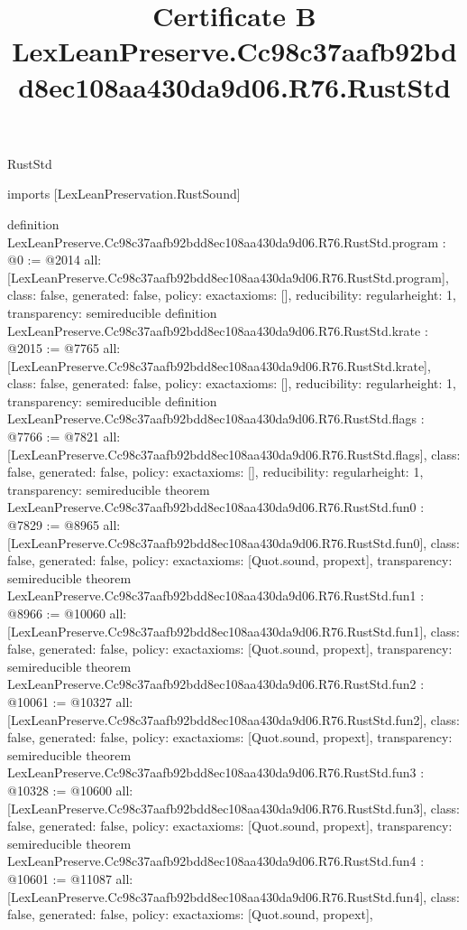 \begin{lexlean}{RustStd}
\title{Certificate B LexLeanPreserve.Cc98c37aafb92bdd8ec108aa430da9d06.R76.RustStd}
\begin{coremodule}
imports [LexLeanPreservation.RustSound]

definition LexLeanPreserve.Cc98c37aafb92bdd8ec108aa430da9d06.R76.RustStd.program : @0 := @2014 {
  all: [LexLeanPreserve.Cc98c37aafb92bdd8ec108aa430da9d06.R76.RustStd.program],
  class: false,
  generated: false,
  policy: exact{axioms: []},
  reducibility: regular{height: 1},
  transparency: semireducible
}
definition LexLeanPreserve.Cc98c37aafb92bdd8ec108aa430da9d06.R76.RustStd.krate : @2015 := @7765 {
  all: [LexLeanPreserve.Cc98c37aafb92bdd8ec108aa430da9d06.R76.RustStd.krate],
  class: false,
  generated: false,
  policy: exact{axioms: []},
  reducibility: regular{height: 1},
  transparency: semireducible
}
definition LexLeanPreserve.Cc98c37aafb92bdd8ec108aa430da9d06.R76.RustStd.flags : @7766 := @7821 {
  all: [LexLeanPreserve.Cc98c37aafb92bdd8ec108aa430da9d06.R76.RustStd.flags],
  class: false,
  generated: false,
  policy: exact{axioms: []},
  reducibility: regular{height: 1},
  transparency: semireducible
}
theorem LexLeanPreserve.Cc98c37aafb92bdd8ec108aa430da9d06.R76.RustStd.fun0 : @7829 := @8965 {
  all: [LexLeanPreserve.Cc98c37aafb92bdd8ec108aa430da9d06.R76.RustStd.fun0],
  class: false,
  generated: false,
  policy: exact{axioms: [Quot.sound, propext]},
  transparency: semireducible
}
theorem LexLeanPreserve.Cc98c37aafb92bdd8ec108aa430da9d06.R76.RustStd.fun1 : @8966 := @10060 {
  all: [LexLeanPreserve.Cc98c37aafb92bdd8ec108aa430da9d06.R76.RustStd.fun1],
  class: false,
  generated: false,
  policy: exact{axioms: [Quot.sound, propext]},
  transparency: semireducible
}
theorem LexLeanPreserve.Cc98c37aafb92bdd8ec108aa430da9d06.R76.RustStd.fun2 : @10061 := @10327 {
  all: [LexLeanPreserve.Cc98c37aafb92bdd8ec108aa430da9d06.R76.RustStd.fun2],
  class: false,
  generated: false,
  policy: exact{axioms: [Quot.sound, propext]},
  transparency: semireducible
}
theorem LexLeanPreserve.Cc98c37aafb92bdd8ec108aa430da9d06.R76.RustStd.fun3 : @10328 := @10600 {
  all: [LexLeanPreserve.Cc98c37aafb92bdd8ec108aa430da9d06.R76.RustStd.fun3],
  class: false,
  generated: false,
  policy: exact{axioms: [Quot.sound, propext]},
  transparency: semireducible
}
theorem LexLeanPreserve.Cc98c37aafb92bdd8ec108aa430da9d06.R76.RustStd.fun4 : @10601 := @11087 {
  all: [LexLeanPreserve.Cc98c37aafb92bdd8ec108aa430da9d06.R76.RustStd.fun4],
  class: false,
  generated: false,
  policy: exact{axioms: [Quot.sound, propext]},
}
\end{coremodule}
\end{lexlean}

